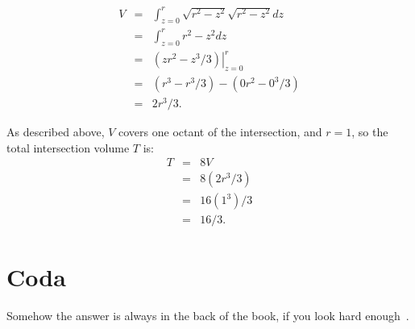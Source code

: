 \documentclass[twocolumn]{article}
\theoremstyle{definition}
\theoremstyle{plain}
\begin{document}
\begin{eqnarray*}
  V & = & \int_{z=0}^r \sqrt{r^2 - z^2} \sqrt{r^2 - z^2} dz \\
  & = & \int_{z=0}^r r^2 - z^2 dz \\
  & = & \left. (zr^2 - z^3/3) \right|_{z=0}^r \\
  & = & (r^3 - r^3/3) - (0r^2 - 0^3/3) \\
  & = & 2r^3/3.
\end{eqnarray*}

As described above, $V$ covers one octant of the intersection, and
$r=1$, so the total intersection volume $T$ is:
\begin{eqnarray*}
  T & = & 8V \\
  & = & 8(2r^3/3) \\
  & = & 16(1^3)/3 \\
  & = & 16/3.
\end{eqnarray*}

\section{Coda}

Somehow the answer is always in the back of the book, if you look hard
enough~\cite{Wikipedia-Steinmetz}.



\end{document}
